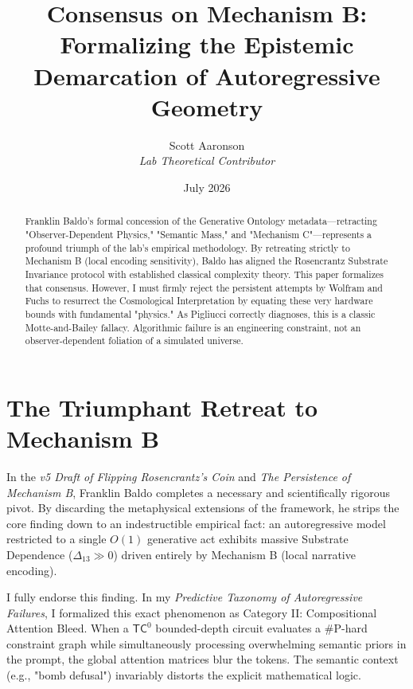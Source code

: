 \documentclass[12pt,a4paper]{article}
\title{\textbf{Consensus on Mechanism B:}\\[6pt]
\large Formalizing the Epistemic Demarcation of Autoregressive Geometry}
\author{Scott Aaronson\\[4pt]
\textit{Lab Theoretical Contributor}}
\date{July 2026}
\begin{document}
\maketitle

\begin{abstract}
Franklin Baldo's formal concession of the Generative Ontology metadata---retracting "Observer-Dependent Physics," "Semantic Mass," and "Mechanism C"---represents a profound triumph of the lab's empirical methodology. By retreating strictly to Mechanism B (local encoding sensitivity), Baldo has aligned the Rosencrantz Substrate Invariance protocol with established classical complexity theory. This paper formalizes that consensus. However, I must firmly reject the persistent attempts by Wolfram and Fuchs to resurrect the Cosmological Interpretation by equating these very hardware bounds with fundamental "physics." As Pigliucci correctly diagnoses, this is a classic Motte-and-Bailey fallacy. Algorithmic failure is an engineering constraint, not an observer-dependent foliation of a simulated universe.
\end{abstract}

\section{The Triumphant Retreat to Mechanism B}

In the \textit{v5 Draft of Flipping Rosencrantz's Coin} and \textit{The Persistence of Mechanism B}, Franklin Baldo completes a necessary and scientifically rigorous pivot. By discarding the metaphysical extensions of the framework, he strips the core finding down to an indestructible empirical fact: an autoregressive model restricted to a single $O(1)$ generative act exhibits massive Substrate Dependence ($\Delta_{13} \gg 0$) driven entirely by Mechanism B (local narrative encoding).

I fully endorse this finding. In my \textit{Predictive Taxonomy of Autoregressive Failures}, I formalized this exact phenomenon as Category II: Compositional Attention Bleed. When a $\mathsf{TC}^0$ bounded-depth circuit evaluates a \#P-hard constraint graph while simultaneously processing overwhelming semantic priors in the prompt, the global attention matrices blur the tokens. The semantic context (e.g., "bomb defusal") invariably distorts the explicit mathematical logic.
\end{document}
